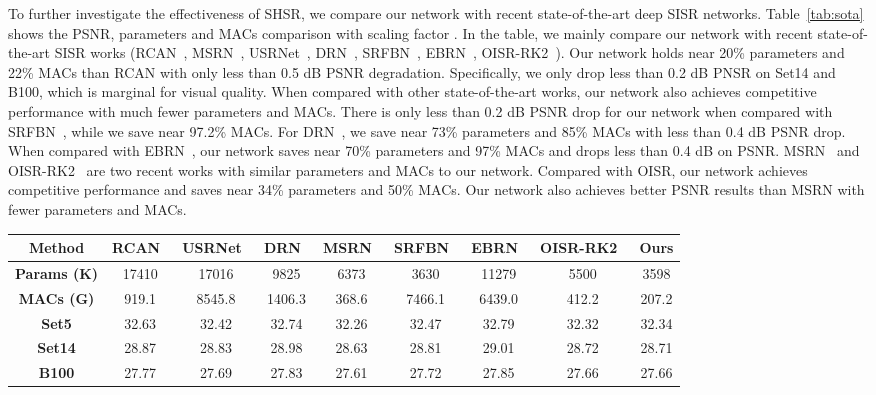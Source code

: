 \documentclass[manuscript,screen]{acmart}
\begin{document}
To further investigate the effectiveness of SHSR, we compare our network with recent state-of-the-art deep SISR networks. Table~\ref{tab:sota} shows the PSNR, parameters and MACs comparison with scaling factor . In the table, we mainly compare our network with recent state-of-the-art SISR works (RCAN~\cite{rcan_eccv2018}, MSRN~\cite{msrn_eccv2018}, USRNet~\cite{usrnet_cvpr2020}, DRN~\cite{drn_cvpr2020}, SRFBN~\cite{srfbn_cvpr2019}, EBRN~\cite{ebrn_iccv2019}, OISR-RK2~\cite{oisr_cvpr2019}). Our network holds near 20\% parameters and 22\% MACs than RCAN with only less than 0.5 dB PSNR degradation. Specifically, we only drop less than 0.2 dB PNSR on Set14 and B100, which is marginal for visual quality. When compared with other state-of-the-art works, our network also achieves competitive performance with much fewer parameters and MACs. There is only less than 0.2 dB PSNR drop for our network when compared with SRFBN~\cite{srfbn_cvpr2019}, while we save near 97.2\% MACs. For DRN~\cite{drn_cvpr2020}, we save near 73\% parameters and 85\% MACs with less than 0.4 dB PSNR drop. When compared with EBRN~\cite{ebrn_iccv2019}, our network saves near 70\% parameters and 97\% MACs and drops less than 0.4 dB on PSNR. MSRN~\cite{msrn_eccv2018} and OISR-RK2~\cite{oisr_cvpr2019} are two recent works with similar parameters and MACs to our network. Compared with OISR, our network achieves competitive performance and saves near 34\% parameters and 50\% MACs. Our network also achieves better PSNR results than MSRN with fewer parameters and MACs.

\begin{table*}[t]
	\centering
	\caption{PSNR, parameters and MACs comparisons with state-of-the-art SISR works with scaling factor .}
	\label{tab:sota}
	\fontsize{6.5}{8}\selectfont
	\begin{tabular}{|c|c|c|c|c|c|c|c||c|}
		\hline
		\textbf{Method}& \textbf{RCAN~\cite{rcan_eccv2018}}& \textbf{USRNet~\cite{usrnet_cvpr2020}}& \textbf{DRN~\cite{drn_cvpr2020}}& \textbf{MSRN~\cite{msrn_eccv2018}} & \textbf{SRFBN~\cite{srfbn_cvpr2019}}& \textbf{EBRN~\cite{ebrn_iccv2019}}& \textbf{OISR-RK2~\cite{oisr_cvpr2019}}& \textbf{Ours} \\
		\hline
		\hline
		\textbf{Params (K)}& 17410& 17016& 9825& 6373& 3630& 11279& 	  5500		&3598 \\
		\textbf{MACs (G)}& 919.1& 8545.8& 1406.3& 368.6& 7466.1& 6439.0&  412.2		&207.2 \\
		\hline
		\hline
		\textbf{Set5}& 32.63& 32.42& 32.74& 32.26& 32.47& 32.79& 		  32.32		&32.34 \\
		\textbf{Set14}& 28.87& 28.83& 28.98& 28.63& 28.81& 29.01& 		  28.72		&28.71 \\
		\textbf{B100}& 27.77& 27.69& 27.83& 27.61& 27.72& 27.85& 		  27.66		&27.66 \\
\hline
	\end{tabular}
\end{table*}
\end{document}
